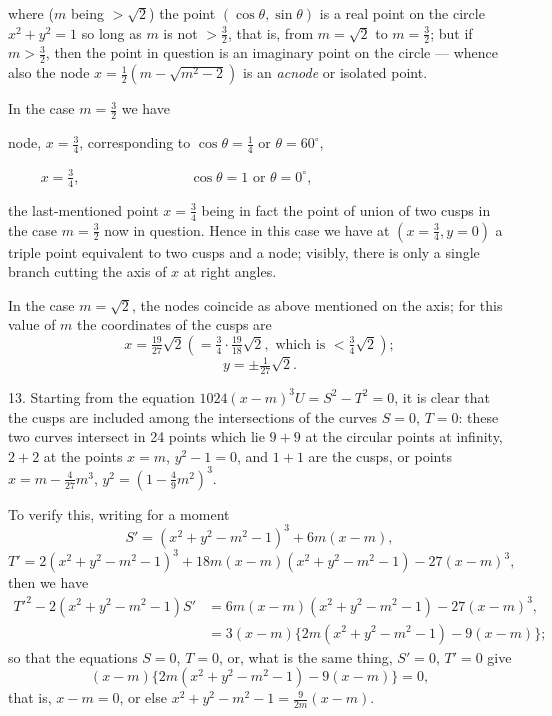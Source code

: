 \documentclass[11pt,a4paper]{article}
\theoremstyle{plain}
\begin{document}
where ($m$ being $> \sqrt{2}$) the point $(\cos\theta, \sin\theta)$ is a real point on the circle $x^2 + y^2 = 1$ so long as $m$ is not $> \frac32$, that is, from $m = \sqrt{2}$ to $m = \frac32$; but if $m > \frac32$, then the point in question is an imaginary point on the circle --- whence also the node $x = \tfrac12(m - \sqrt{m^2 - 2})$ is an \textit{acnode} or isolated point.

In the case $m = \frac32$ we have

node, $x = \frac34$, corresponding to $\cos\theta = \frac14$ or $\theta = 60^{\circ}$,

$\phantom{\text{node,}} x = \frac34$, $\phantom{\text{corresponding to}}$ $\cos\theta = 1$ or $\theta = 0^{\circ}$,

the last-mentioned point $x = \frac34$ being in fact the point of union of two cusps in the case $m = \frac32$ now in question. Hence in this case we have at $(x = \frac34, y = 0)$ a triple point equivalent to two cusps and a node; visibly, there is only a single branch cutting the axis of $x$ at right angles.

In the case $m = \sqrt{2}$, the nodes coincide as above mentioned on the axis; for this value of $m$ the coordinates of the cusps are
\[
x = \tfrac{19}{27}\sqrt{2} (= \tfrac34 \cdot \tfrac{19}{18}\sqrt{2}, \text{ which is } < \tfrac34\sqrt{2});
\]
\[
y = \pm \tfrac{1}{27}\sqrt{2}.
\]

13. Starting from the equation $1024(x-m)^3 U = S^2 - T^2 = 0$, it is clear that the cusps are included among the intersections of the curves $S = 0$, $T = 0$: these two curves intersect in 24 points which lie $9 + 9$ at the circular points at infinity, $2 + 2$ at the points $x = m$, $y^2 - 1 = 0$, and $1 + 1$ are the cusps, or points $x = m - \frac{4}{27}m^3$, $y^2 = (1 - \frac49m^2)^3$.

To verify this, writing for a moment
\[
S' = (x^2 + y^2 - m^2 - 1)^3 + 6m(x-m),
\]
\[
T' = 2(x^2 + y^2 - m^2 - 1)^3 + 18m(x-m)(x^2 + y^2 - m^2 - 1) - 27(x-m)^3,
\]
then we have
\begin{align*}
T'^2 - 2(x^2 + y^2 - m^2 - 1)S' &= 6m(x-m)(x^2 + y^2 - m^2 - 1) - 27(x-m)^3, \\
&= 3(x-m)\{2m(x^2 + y^2 - m^2 - 1) - 9(x-m)\};
\end{align*}
so that the equations $S = 0$, $T = 0$, or, what is the same thing, $S' = 0$, $T' = 0$ give
\[
(x-m)\{2m(x^2 + y^2 - m^2 - 1) - 9(x-m)\} = 0,
\]
that is, $x - m = 0$, or else $x^2 + y^2 - m^2 - 1 = \frac{9}{2m}(x-m)$.
\end{document}
